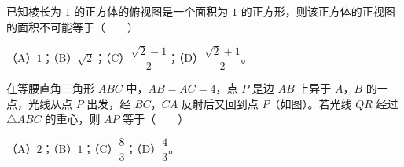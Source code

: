 \begin{question}
已知棱长为 $1$ 的正方体的俯视图是一个面积为 $1$ 的正方形，则该正方体的正视图的面积不可能等于\mbox{（　　）}

（A）$1$；（B）$\sqrt2$；（C）$\dfrac{\sqrt2-1}{2}$；（D）$\dfrac{\sqrt2+1}{2}$。

\Needspace{0.4\textheight}
\end{question}
\begin{question}
在等腰直角三角形 $ABC$ 中，$AB=AC=4$，点 $P$ 是边 $AB$ 上异于 $A$，$B$ 的一点，光线从点 $P$ 出发，经 $BC$，$CA$ 反射后又回到点 $P$（如图）。若光线 $QR$ 经过 $\triangle ABC$ 的重心，则 $AP$ 等于\mbox{（　　）}
\nopagebreak[4]
\begin{center}\end{center}
\nopagebreak[4]
（A）$2$；（B）$1$；（C）$\dfrac83$；（D）$\dfrac43$。

\end{question}

